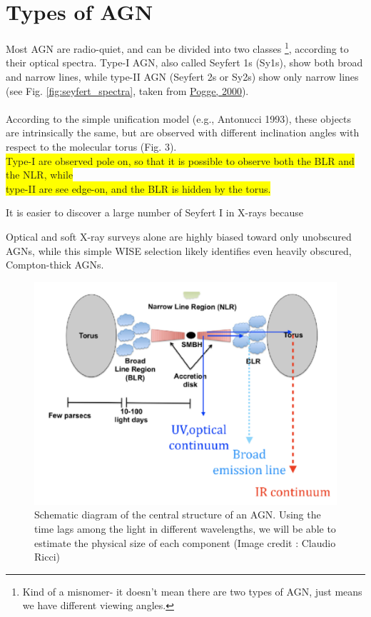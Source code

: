 \section{Types of AGN }
Most AGN are radio-quiet, and can be divided into two classes \footnote{Kind of a misnomer- it doesn't mean there are two types of AGN, just means we have different viewing angles.}, according to their optical spectra. Type-I AGN, also called Seyfert 1s (Sy1s), show both broad and narrow lines, while type-II AGN (Seyfert 2s or Sy2s) show only narrow lines (see Fig. \ref{fig:seyfert_spectra}, taken from \href{https://reader.elsevier.com/reader/sd/pii/S1387647300000658?token=660DD777DEA7E41F7AD39364C79E4FA98C1E0C5C81431C48635052498601540CC37DC9AC7BA43B3AADF61AA5A59524EB&originRegion=eu-west-1&originCreation=20230127115455}{Pogge, 2000}). \\
\\
According to the simple unification model (e.g., Antonucci 1993), these objects are intrinsically the same, but are observed with different inclination angles with respect to the molecular torus (Fig. 3). \\
\colorbox{yellow}{Type-I are observed pole on, so that it is possible to observe both the BLR and the NLR, while} \\
\colorbox{yellow}{type-II are see edge-on, and the BLR is hidden by the torus.}

It is easier to discover a large number of Seyfert I in X-rays because 


Optical and soft X-ray surveys alone are highly biased toward only unobscured AGNs, while this simple WISE selection likely identifies even heavily obscured, Compton-thick AGNs.



\begin{figure}
    \centering
    \includegraphics[scale=0.6]{Notes_Images/AGN_Schematic.png}
    \caption{Schematic diagram of the central structure of an AGN. Using the time lags among the light in different wavelengths, we will be able to estimate the physical size of each component (Image credit : Claudio Ricci)  }
    \label{fig:agn_schematic}
\end{figure}

